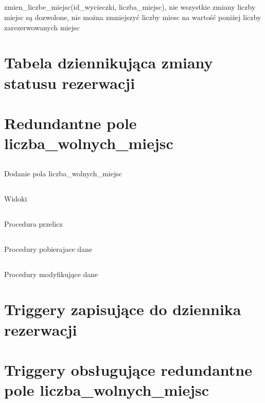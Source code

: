 \documentclass[12pt]{article}
\begin{document}
\subsection{}
zmien\_liczbe\_miejsc(id\_wycieczki, liczba\_miejsc), nie wszystkie zmiany liczby miejsc są
dozwolone, nie można zmniejszyć liczby miesc na wartość poniżej liczby zarezerwowanych
miejsc


\section{Tabela dziennikująca zmiany statusu rezerwacji}


\section{Redundantne pole liczba\_wolnych\_miejsc}
\subsection{}
Dodanie pola liczba\_wolnych\_miejsc

\subsection{}
Widoki





\subsection{}
Procedura przelicz

\subsection{}
Procedury pobierajace dane



\subsection{}
Procedury modyfikujące dane

\section{Triggery zapisujące do dziennika rezerwacji}

\section{Triggery obsługujące redundantne pole liczba\_wolnych\_miejsc}

\end{document}
